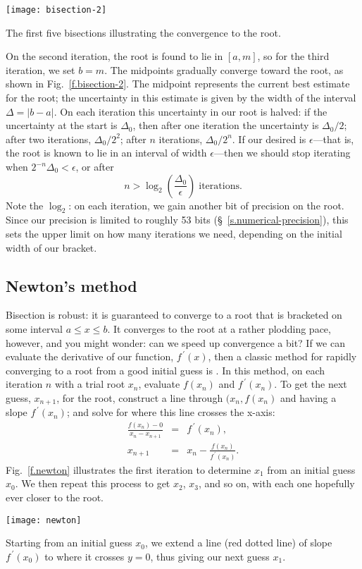 \begin{marginfigure}[12\baselineskip]
\texttt{[image: bisection-2]}
\caption[First five bisections]{The first five bisections illustrating the convergence to the root.\label{f.bisection-2}}
\end{marginfigure}
On the second iteration, the root is found to lie in $[a, m]$, so for the third iteration, we set $b=m$. The midpoints gradually converge toward the root, as shown in Fig.~\ref{f.bisection-2}. 
The midpoint represents the current best estimate for the root; the uncertainty in this estimate is given by the width of the interval $\Delta = |b-a|$.
On each iteration this uncertainty in our root is halved: if the uncertainty at the start is $\Delta_{0}$, then after one iteration the uncertainty is $\Delta_{0}/2$; after two iterations, $\Delta_{0}/2^{2}$; after $n$ iterations, $\Delta_{0}/2^{n}$. If our desired  is $\epsilon$---that is, the root is known to lie in an interval of width $\epsilon$---then we should stop iterating when $2^{-n}\Delta_{0} < \epsilon$, or after
\[
	n > \log_{2}\left(\frac{\Delta_{0}}{\epsilon}\right)\;\textrm{iterations.}
\]
Note the $\log_{2}$: on each iteration, we gain another bit of precision on the root. Since our precision is limited to roughly 53 bits (\S~\ref{s.numerical-precision}), this sets the upper limit on how many iterations we need, depending on the initial width of our bracket.

\subsection{Newton's method}
Bisection is robust: it is guaranteed to converge to a root that is bracketed on some interval $a \le x \le b$. It converges to the root at a rather plodding pace, however, and you might wonder: can we speed up convergence a bit? If we can evaluate the derivative of our function, $f^{\,\prime}(x)$, then a classic method for rapidly converging to a root from a good initial guess is .  In this method, on each iteration $n$ with a trial root $x_{n}$, evaluate $f(x_{n})$ and $f^{\,\prime}(x_{n})$. To get the next guess, $x_{n+1}$, for the root, construct a line through $(x_{n},f(x_{n})$ and having a slope $f^{\,\prime}(x_{n})$; and solve for where this line crosses the x-axis:
\begin{eqnarray*}
\frac{f(x_{n})-0}{x_{n}-x_{n+1}} &=& f^{\,\prime}(x_{n}),\\
x_{n+1} &=& x_{n} - \frac{f(x_{n})}{f^{\,\prime}(x_{n})}.
\end{eqnarray*}
Fig.~\ref{f.newton} illustrates the first iteration to determine $x_{1}$ from an initial guess $x_{0}$. We then repeat this process to get $x_{2}$, $x_{3}$, and so on, with each one hopefully ever closer to the root.
\begin{marginfigure}[-10\baselineskip]
\texttt{[image: newton]}
\caption[Schematic of Newton's method]{Starting from an initial guess $x_{0}$, we extend a line (red dotted line) of slope $f^{\,\prime}(x_{0})$ to where it crosses $y=0$, thus giving our next guess $x_{1}$.\label{f.newton}}
\end{marginfigure}

